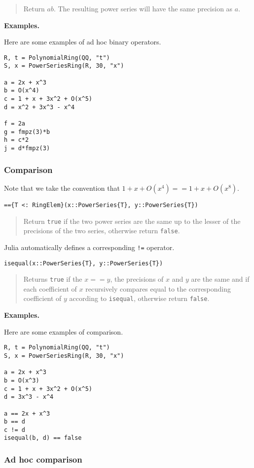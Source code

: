 \documentclass[a4paper,10pt]{article}
\newcommand{\code}{\lstinline}
\newcommand{\desc}[1]{\vspace{-3mm}\begin{quote}#1\end{quote}}
\begin{document}
\desc{Return $ab$. The resulting power series will have the same precision as
$a$.}

\textbf{Examples.}

Here are some examples of ad hoc binary operators.

\begin{lstlisting}
R, t = PolynomialRing(QQ, "t")
S, x = PowerSeriesRing(R, 30, "x")

a = 2x + x^3
b = O(x^4)
c = 1 + x + 3x^2 + O(x^5)
d = x^2 + 3x^3 - x^4

f = 2a
g = fmpz(3)*b
h = c*2
j = d*fmpz(3)
\end{lstlisting}

\subsubsection{Comparison}

Note that we take the convention that $1 + x + O(x^4) == 1 + x + O(x^8)$. 

\begin{lstlisting}
=={T <: RingElem}(x::PowerSeries{T}, y::PowerSeries{T})
\end{lstlisting}

\desc{Return \code{true} if the two power series are the same up to the lesser
of the precisions of the two series, otherwise return \code{false}.}

Julia automatically defines a corresponding \code{!=} operator.

\begin{lstlisting}
isequal(x::PowerSeries{T}, y::PowerSeries{T})
\end{lstlisting}

\desc{Returns \code{true} if the $x == y$, the precisions of $x$ and $y$ are
the same and if each coefficient of $x$ recursively compares equal to the
corresponding coefficient of $y$ according to \code{isequal}, otherwise return
\code{false}.}

\textbf{Examples.}

Here are some examples of comparison.

\begin{lstlisting}
R, t = PolynomialRing(QQ, "t")
S, x = PowerSeriesRing(R, 30, "x")

a = 2x + x^3
b = O(x^3)
c = 1 + x + 3x^2 + O(x^5)
d = 3x^3 - x^4

a == 2x + x^3
b == d
c != d
isequal(b, d) == false
\end{lstlisting}

\subsubsection{Ad hoc comparison}
\end{document}
